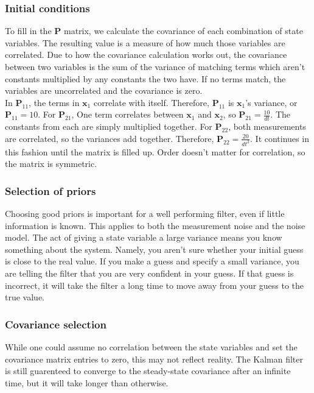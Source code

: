 \documentclass[10pt,conference,compsoc]{IEEEtran}
\newcommand{\mtx}[1] {\bm #1}
\begin{document}
\subsubsection{Initial conditions}

\noindent To fill in the $\mtx{P}$ matrix, we calculate the covariance of each
combination of state variables. The resulting value is a measure of how much
those variables are correlated. Due to how the covariance calculation works out,
the covariance between two variables is the sum of the variance of matching
terms which aren't constants multiplied by any constants the two have. If no
terms match, the variables are uncorrelated and the covariance is zero. \\

\noindent In $\mtx{P}_{11}$, the terms in $\mtx{x}_1$ correlate with itself.
Therefore, $\mtx{P}_{11}$ is $\mtx{x}_1$'s variance, or $\mtx{P}_{11} = 10$.
For $\mtx{P}_{21}$, One term correlates between $\mtx{x}_1$ and $\mtx{x}_2$, so
$\mtx{P}_{21} = \frac{10}{dt}$. The constants from each are simply multiplied
together. For $\mtx{P}_{22}$, both measurements are correlated, so the variances
add together. Therefore, $\mtx{P}_{22} = \frac{20}{dt^2}$. It continues in this
fashion until the matrix is filled up. Order doesn't matter for correlation, so
the matrix is symmetric. \\

\subsubsection{Selection of priors}

\noindent Choosing good priors is important for a well performing filter, even
if little information is known. This applies to both the measurement noise and
the noise model. The act of giving a state variable a large variance means you
know something about the system. Namely, you aren't sure whether your initial
guess is close to the real value. If you make a guess and specify a small
variance, you are telling the filter that you are very confident in your guess.
If that guess is incorrect, it will take the filter a long time to move away
from your guess to the true value.

\subsubsection{Covariance selection}

While one could assume no correlation between the state variables and set the
covariance matrix entries to zero, this may not reflect reality. The Kalman
filter is still guarenteed to converge to the steady-state covariance after an
infinite time, but it will take longer than otherwise.
\end{document}
